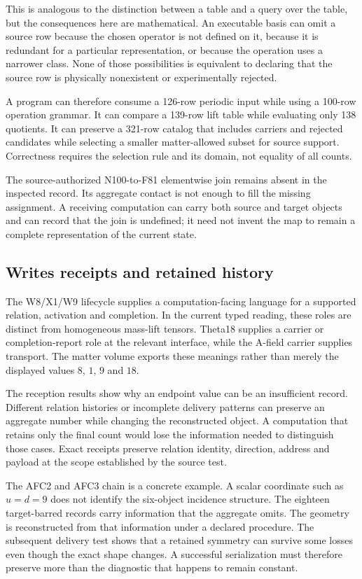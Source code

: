 This is analogous to the distinction between a table and a query over the table, but the consequences here are mathematical. An executable basis can omit a source row because the chosen operator is not defined on it, because it is redundant for a particular representation, or because the operation uses a narrower class. None of those possibilities is equivalent to declaring that the source row is physically nonexistent or experimentally rejected.

A program can therefore consume a 126-row periodic input while using a 100-row operation grammar. It can compare a 139-row lift table while evaluating only 138 quotients. It can preserve a 321-row catalog that includes carriers and rejected candidates while selecting a smaller matter-allowed subset for source support. Correctness requires the selection rule and its domain, not equality of all counts.

The source-authorized N100-to-F81 elementwise join remains absent in the inspected record. Its aggregate contact is not enough to fill the missing assignment. A receiving computation can carry both source and target objects and can record that the join is undefined; it need not invent the map to remain a complete representation of the current state.

\subsection{Writes receipts and retained history}

The W8/X1/W9 lifecycle supplies a computation-facing language for a supported relation, activation and completion. In the current typed reading, these roles are distinct from homogeneous mass-lift tensors. Theta18 supplies a carrier or completion-report role at the relevant interface, while the A-field carrier supplies transport. The matter volume exports these meanings rather than merely the displayed values $8$, $1$, $9$ and $18$.

The reception results show why an endpoint value can be an insufficient record. Different relation histories or incomplete delivery patterns can preserve an aggregate number while changing the reconstructed object. A computation that retains only the final count would lose the information needed to distinguish those cases. Exact receipts preserve relation identity, direction, address and payload at the scope established by the source test.

The AFC2 and AFC3 chain is a concrete example. A scalar coordinate such as $u=d=9$ does not identify the six-object incidence structure. The eighteen target-barred records carry information that the aggregate omits. The geometry is reconstructed from that information under a declared procedure. The subsequent delivery test shows that a retained symmetry can survive some losses even though the exact shape changes. A successful serialization must therefore preserve more than the diagnostic that happens to remain constant.

